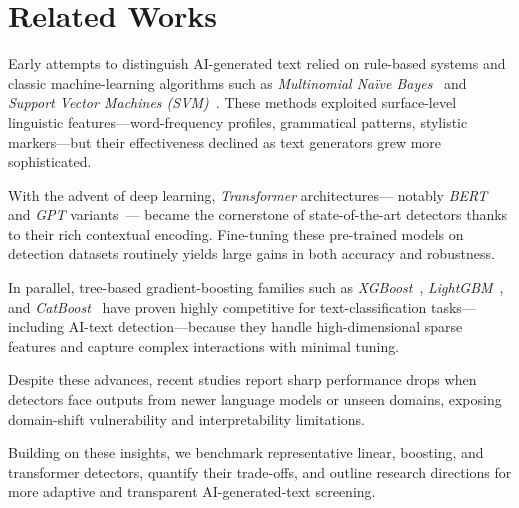 \section{Related Works}

Early attempts to distinguish AI-generated text relied on rule-based
systems and classic machine-learning algorithms such as
\emph{Multinomial Naïve Bayes}~\cite{mccallum1998naivebayes} and
\emph{Support Vector Machines (SVM)}~\cite{joachims1998svm}.
These methods exploited surface-level linguistic features—word-frequency
profiles, grammatical patterns, stylistic markers—but their effectiveness
declined as text generators grew more sophisticated.

With the advent of deep learning, \emph{Transformer} architectures—
notably \emph{BERT}~\cite{devlin2019bert} and \emph{GPT} variants~\cite{radford2019gpt}—
became the cornerstone of state-of-the-art detectors thanks to their rich
contextual encoding. Fine-tuning these pre-trained models on detection
datasets routinely yields large gains in both accuracy and robustness.

In parallel, tree-based gradient-boosting families such as
\emph{XGBoost}~\cite{chen2016xgboost},
\emph{LightGBM}~\cite{ke2017lightgbm}, and
\emph{CatBoost}~\cite{prokhorenkova2018catboost}
have proven highly competitive for text-classification tasks—
including AI-text detection—because they handle high-dimensional sparse
features and capture complex interactions with minimal tuning.

Despite these advances, recent studies report sharp performance drops
when detectors face outputs from newer language models or unseen
domains, exposing domain-shift vulnerability and interpretability
limitations.

Building on these insights, we benchmark representative linear,
boosting, and transformer detectors, quantify their trade-offs, and
outline research directions for more adaptive and transparent
AI-generated-text screening.
